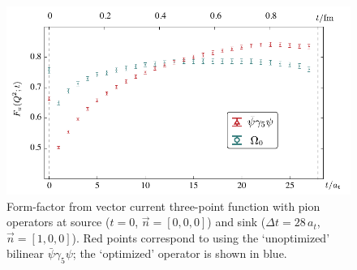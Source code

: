 \documentclass[twocolumn,amsmath,amssymb,prd,10pt,floatfix, 
superscriptaddress,nofootinbib, showpacs, preprintnumbers]{revtex4-1}
\begin{document}
\begin{figure}[b]
\includegraphics[width=1.03\linewidth]{fig6.pdf}
\caption{Form-factor from vector current three-point function with pion operators at source ($t=0$, $\vec{n}=[0,0,0]$) and sink ($\Delta t = 28\,a_t$, $\vec{n} = [1,0,0]$). Red points correspond to using the `unoptimized' bilinear $\bar{\psi} \gamma_5 \psi$;  the `optimized' operator is shown in blue.
\label{fig::ThreePointRelaxationPion}}
\end{figure}
\end{document}
